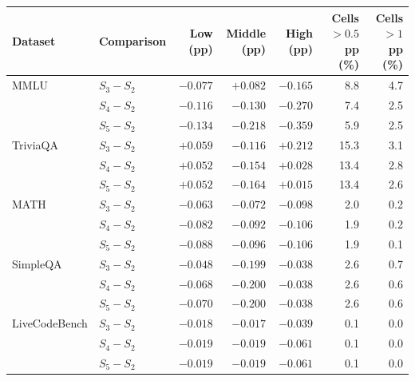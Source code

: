 \begin{tabular}{llrrrrr}
\toprule
Dataset & Comparison & Low (pp) & Middle (pp) & High (pp) & Cells $>0.5$ pp (\%) & Cells $>1$ pp (\%) \\
\midrule
MMLU & $S_3-S_2$ & $-0.077$ & $+0.082$ & $-0.165$ & 8.8 & 4.7 \\
 & $S_4-S_2$ & $-0.116$ & $-0.130$ & $-0.270$ & 7.4 & 2.5 \\
 & $S_5-S_2$ & $-0.134$ & $-0.218$ & $-0.359$ & 5.9 & 2.5 \\
TriviaQA & $S_3-S_2$ & $+0.059$ & $-0.116$ & $+0.212$ & 15.3 & 3.1 \\
 & $S_4-S_2$ & $+0.052$ & $-0.154$ & $+0.028$ & 13.4 & 2.8 \\
 & $S_5-S_2$ & $+0.052$ & $-0.164$ & $+0.015$ & 13.4 & 2.6 \\
MATH & $S_3-S_2$ & $-0.063$ & $-0.072$ & $-0.098$ & 2.0 & 0.2 \\
 & $S_4-S_2$ & $-0.082$ & $-0.092$ & $-0.106$ & 1.9 & 0.2 \\
 & $S_5-S_2$ & $-0.088$ & $-0.096$ & $-0.106$ & 1.9 & 0.1 \\
SimpleQA & $S_3-S_2$ & $-0.048$ & $-0.199$ & $-0.038$ & 2.6 & 0.7 \\
 & $S_4-S_2$ & $-0.068$ & $-0.200$ & $-0.038$ & 2.6 & 0.6 \\
 & $S_5-S_2$ & $-0.070$ & $-0.200$ & $-0.038$ & 2.6 & 0.6 \\
LiveCodeBench & $S_3-S_2$ & $-0.018$ & $-0.017$ & $-0.039$ & 0.1 & 0.0 \\
 & $S_4-S_2$ & $-0.019$ & $-0.019$ & $-0.061$ & 0.1 & 0.0 \\
 & $S_5-S_2$ & $-0.019$ & $-0.019$ & $-0.061$ & 0.1 & 0.0 \\
\bottomrule
\end{tabular}
